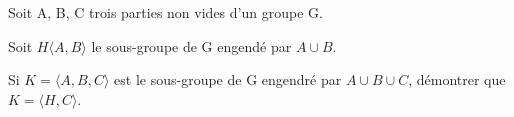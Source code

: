 Soit A, B, C trois parties non vides d'un groupe G. 

Soit $H \langle A, B \rangle$ le sous-groupe de G engendé par $A \cup B$.

Si $K = \langle A, B, C \rangle$ est le sous-groupe de G engendré par $A \cup B \cup C$, démontrer que $K = \langle H, C \rangle$.